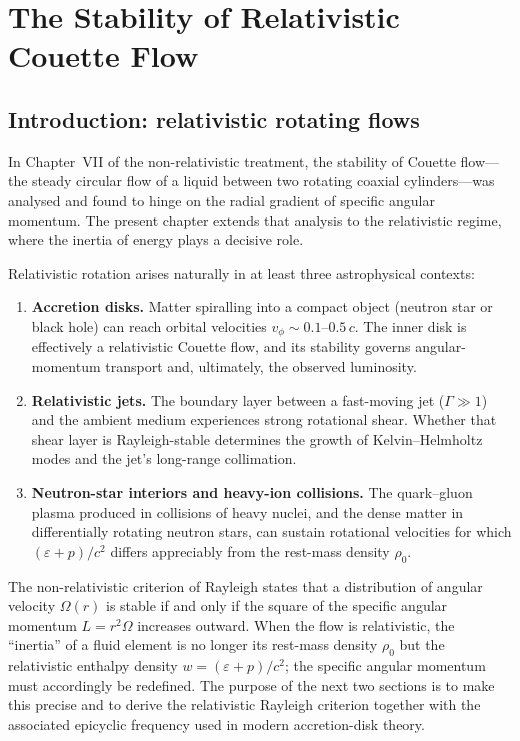 
\chapter{The Stability of Relativistic Couette Flow}
\label{ch:rel-7}

\section{Introduction: relativistic rotating flows}\label{sec:rel-7-64}

In Chapter~VII of the non-relativistic treatment, the stability of
Couette flow---the steady circular flow of a liquid between two
rotating coaxial cylinders---was analysed and found to hinge on the
radial gradient of specific angular momentum.  The present chapter
extends that analysis to the relativistic regime, where the inertia
of energy plays a decisive role.

Relativistic rotation arises naturally in at least three
astrophysical contexts:
\begin{enumerate}
\item \textbf{Accretion disks.}  Matter spiralling into a compact
  object (neutron star or black hole) can reach orbital velocities
  $v_{\phi}\sim 0.1$--$0.5\,c$.  The inner disk is effectively a
  relativistic Couette flow, and its stability governs angular-momentum
  transport and, ultimately, the observed luminosity.
\item \textbf{Relativistic jets.}  The boundary layer between a
  fast-moving jet ($\Gamma\gg 1$) and the ambient medium experiences
  strong rotational shear.  Whether that shear layer is Rayleigh-stable
  determines the growth of Kelvin--Helmholtz modes and the jet's
  long-range collimation.
\item \textbf{Neutron-star interiors and heavy-ion collisions.}
  The quark--gluon plasma produced in collisions of heavy nuclei, and
  the dense matter in differentially rotating neutron stars, can sustain
  rotational velocities for which $(\varepsilon+p)/c^{2}$ differs
  appreciably from the rest-mass density $\rho_{0}$.
\end{enumerate}

The non-relativistic criterion of Rayleigh states that a
distribution of angular velocity $\Omega(r)$ is stable if and only if
the square of the specific angular momentum $L=r^{2}\Omega$ increases
outward.  When the flow is relativistic, the ``inertia'' of a fluid
element is no longer its rest-mass density $\rho_{0}$ but the
relativistic enthalpy density $w=(\varepsilon+p)/c^{2}$; the specific
angular momentum must accordingly be redefined.  The purpose of the
next two sections is to make this precise and to derive the
relativistic Rayleigh criterion together with the associated
epicyclic frequency used in modern accretion-disk theory.

